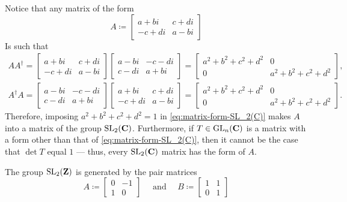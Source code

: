 \begin{example}
\label{exp:SL_2(C)-form}
Notice that any matrix of the form
\begin{equation}\label{eq:matrix-form-SL_2(C)}
  A \coloneq
  \begin{bmatrix}
    a + bi   & c + di \\
    - c + di & a - bi
  \end{bmatrix}
\end{equation}
Is such that
\begin{gather*}
  A A^{\dag} =
  \begin{bmatrix}
    a + bi   & c + di \\
    - c + di & a - bi
  \end{bmatrix}
  \begin{bmatrix}
    a - bi & -c - di \\
    c - di & a + bi
  \end{bmatrix}
  =
  \begin{bmatrix}
    a^2 + b^2 + c^2 + d^2 & 0 \\
    0                    & a^2 + b^2 + c^2 + d^2
  \end{bmatrix},
  \\%
  A^{\dag} A =
  \begin{bmatrix}
    a - bi & -c - di \\
    c - di & a + bi
  \end{bmatrix}
  \begin{bmatrix}
    a + bi   & c + di \\
    - c + di & a - bi
  \end{bmatrix}
  =
  \begin{bmatrix}
    a^2 + b^2 + c^2 + d^2 & 0 \\
    0                    & a^2 + b^2 + c^2 + d^2
  \end{bmatrix}.
\end{gather*}
Therefore, imposing \(a^2 + b^2 + c^2 + d^2 = 1\) in
\cref{eq:matrix-form-SL_2(C)} makes \(A\) into a matrix of the group
\(\operatorname{SL}_2(\mathbf{C})\). Furthermore, if \(T \in \operatorname{GL}_n(\mathbf{C})\) is a matrix with a form
other than that of \cref{eq:matrix-form-SL_2(C)}, then it cannot be the case
that \(\det T\) equal \(1\) --- thus, every \(\operatorname{SL}_2(\mathbf{C})\) matrix has the form
of \(A\).
\end{example}

\begin{proposition}
\label{prop:SL_2(Z)-generator-matrices}
The group \(\operatorname{SL}_2(\mathbf{Z})\) is generated by the pair matrices
\[
A \coloneq
\begin{bmatrix}
  0 & -1 \\
  1 & 0
\end{bmatrix}
\quad
\text{ and }
\quad
B \coloneq
\begin{bmatrix}
  1 & 1 \\
  0 & 1
\end{bmatrix}
\]
\end{proposition}

